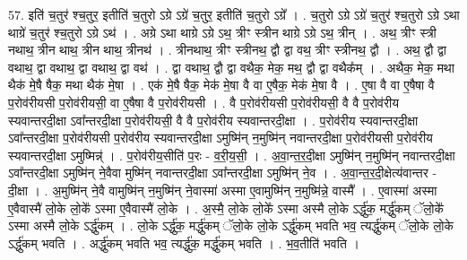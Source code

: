 \documentclass[17pt]{extarticle}
\begin{document}
57. इति॑ च॒तुर॑ श्च॒तुर॒ इतीति॑ च॒तुरो ऽग्रे ऽग्रे॑ च॒तुर॒ इतीति॑ च॒तुरो ऽग्रे᳚ । . च॒तुरो ऽग्रे ऽग्रे॑ च॒तुर॑ श्च॒तुरो ऽग्रे ऽथा थाग्रे॑ च॒तुर॑ श्च॒तुरो ऽग्रे ऽथ॑ । . अग्रे ऽथा थाग्रे ऽग्रे ऽथ॒ त्रीꣳ स्त्रीन थाग्रे ऽग्रे ऽथ॒ त्रीन् । . अथ॒ त्रीꣳ स्त्री नथाथ॒ त्रीन थाथ॒ त्रीन थाथ॒ त्रीनथ॑ । . त्रीनथाथ॒ त्रीꣳ स्त्रीनथ॒ द्वौ द्वा वथ॒ त्रीꣳ स्त्रीनथ॒ द्वौ । . अथ॒ द्वौ द्वा वथाथ॒ द्वा वथाथ॒ द्वा वथाथ॒ द्वा वथ॑ । . द्वा वथाथ॒ द्वौ द्वा वथैक॒ मेक॒ मथ॒ द्वौ द्वा वथैक᳚म् । . अथैक॒ मेक॒ मथा थैक॑ मे॒षै षैक॒ मथा थैक॑ मे॒षा । . एक॑ मे॒षै षैक॒ मेक॑ मे॒षा वै वा ए॒षैक॒ मेक॑ मे॒षा वै । . ए॒षा वै वा ए॒षैषा वै प॒रोव॑रीयसी प॒रोव॑रीयसी॒ वा ए॒षैषा वै प॒रोव॑रीयसी । . वै प॒रोव॑रीयसी प॒रोव॑रीयसी॒ वै वै प॒रोव॑रीय स्यवान्तरदी॒क्षा ऽवा᳚न्तरदी॒क्षा प॒रोव॑रीयसी॒ वै वै प॒रोव॑रीय स्यवान्तरदी॒क्षा । . प॒रोव॑रीय स्यवान्तरदी॒क्षा ऽवा᳚न्तरदी॒क्षा प॒रोव॑रीयसी प॒रोव॑रीय स्यवान्तरदी॒क्षा ऽमुष्मि॑न् न॒मुष्मि॑न् नवान्तरदी॒क्षा प॒रोव॑रीयसी प॒रोव॑रीय स्यवान्तरदी॒क्षा ऽमुष्मिन्न्॑ । . प॒रोव॑रीय॒सीति॑ प॒रः - व॒री॒य॒सी॒ । . अ॒वा॒न्त॒र॒दी॒क्षा ऽमुष्मि॑न् न॒मुष्मि॑न् नवान्तरदी॒क्षा ऽवा᳚न्तरदी॒क्षा ऽमुष्मि॑न् ने॒वैवा मुष्मि॑न् नवान्तरदी॒क्षा ऽवा᳚न्तरदी॒क्षा ऽमुष्मि॑न् ने॒व । . अ॒वा॒न्त॒र॒दी॒क्षेत्य॑वान्तर - दी॒क्षा । . अ॒मुष्मि॑न् ने॒वै वामुष्मि॑न् न॒मुष्मि॑न् ने॒वास्मा॑ अस्मा ए॒वामुष्मि॑न् न॒मुष्मि॑न्ने॒ वास्मै᳚ । . ए॒वास्मा॑ अस्मा ए॒वैवास्मै॑ लो॒के लो॒के᳚ ऽस्मा ए॒वैवास्मै॑ लो॒के । . अ॒स्मै॒ लो॒के लो॒के᳚ ऽस्मा अस्मै लो॒के ऽर्द्धु॑क॒ मर्द्धु॑कम् ॅलो॒के᳚ ऽस्मा अस्मै लो॒के ऽर्द्धु॑कम् । . लो॒के ऽर्द्धु॑क॒ मर्द्धु॑कम् ॅलो॒के लो॒के ऽर्द्धु॑कम् भवति भव॒ त्यर्द्धु॑कम् ॅलो॒के लो॒के ऽर्द्धु॑कम् भवति । . अर्द्धु॑कम् भवति भव॒ त्यर्द्धु॑क॒ मर्द्धु॑कम् भवति । . भ॒व॒तीति॑ भवति । \newline
\pagebreak
{}
\end{document}
